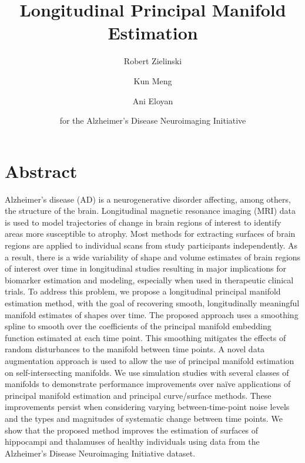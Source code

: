 \documentclass[11pt,reqno]{article}
\theoremstyle{definition}
\begin{document}
\title{Longitudinal Principal Manifold Estimation}
\author[1]{Robert Zielinski}
\author[2]{Kun Meng}
\author[1]{Ani Eloyan}
\author[*]{for the Alzheimer’s Disease Neuroimaging Initiative}



\maketitle

\doublespacing

\section*{Abstract}

Alzheimer's disease (AD) is a neurogenerative disorder affecting, among others, the structure of the brain. Longitudinal magnetic resonance imaging (MRI) data is used to model trajectories of change in brain regions of interest to identify areas more susceptible to atrophy. Most methods for extracting surfaces of brain regions are applied to individual scans from study participants independently. As a result, there is a wide variability of shape and volume estimates of brain regions of interest over time in longitudinal studies resulting in major implications for biomarker estimation and modeling, especially when used in therapeutic clinical trials. To address this problem, we propose a longitudinal principal manifold estimation method, with the goal of recovering smooth, longitudinally meaningful manifold estimates of shapes over time. The proposed approach uses a smoothing spline to smooth over the coefficients of the principal manifold embedding function estimated at each time point. This smoothing mitigates the effects of random disturbances to the manifold between time points. A novel data augmentation approach is used to allow the use of principal manifold estimation on self-intersecting manifolds. We use simulation studies with several classes of manifolds to demonstrate performance improvements over naïve applications of principal manifold estimation and principal curve/surface methods. These improvements persist when considering varying between-time-point noise levels and the types and magnitudes of systematic change between time points. We show that the proposed method improves the estimation of surfaces of hippocampi and thalamuses of healthy individuals using data from the Alzheimer’s Disease Neuroimaging Initiative dataset.
\end{document}

